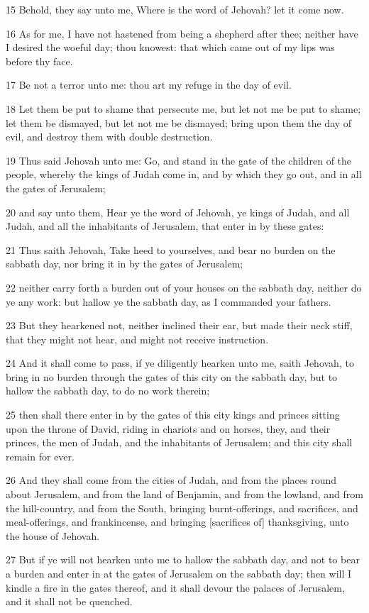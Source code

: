 \par 15 Behold, they say unto me, Where is the word of Jehovah? let it come now.
\par 16 As for me, I have not hastened from being a shepherd after thee; neither have I desired the woeful day; thou knowest: that which came out of my lips was before thy face.
\par 17 Be not a terror unto me: thou art my refuge in the day of evil.
\par 18 Let them be put to shame that persecute me, but let not me be put to shame; let them be dismayed, but let not me be dismayed; bring upon them the day of evil, and destroy them with double destruction.
\par 19 Thus said Jehovah unto me: Go, and stand in the gate of the children of the people, whereby the kings of Judah come in, and by which they go out, and in all the gates of Jerusalem;
\par 20 and say unto them, Hear ye the word of Jehovah, ye kings of Judah, and all Judah, and all the inhabitants of Jerusalem, that enter in by these gates:
\par 21 Thus saith Jehovah, Take heed to yourselves, and bear no burden on the sabbath day, nor bring it in by the gates of Jerusalem;
\par 22 neither carry forth a burden out of your houses on the sabbath day, neither do ye any work: but hallow ye the sabbath day, as I commanded your fathers.
\par 23 But they hearkened not, neither inclined their ear, but made their neck stiff, that they might not hear, and might not receive instruction.
\par 24 And it shall come to pass, if ye diligently hearken unto me, saith Jehovah, to bring in no burden through the gates of this city on the sabbath day, but to hallow the sabbath day, to do no work therein;
\par 25 then shall there enter in by the gates of this city kings and princes sitting upon the throne of David, riding in chariots and on horses, they, and their princes, the men of Judah, and the inhabitants of Jerusalem; and this city shall remain for ever.
\par 26 And they shall come from the cities of Judah, and from the places round about Jerusalem, and from the land of Benjamin, and from the lowland, and from the hill-country, and from the South, bringing burnt-offerings, and sacrifices, and meal-offerings, and frankincense, and bringing [sacrifices of] thanksgiving, unto the house of Jehovah.
\par 27 But if ye will not hearken unto me to hallow the sabbath day, and not to bear a burden and enter in at the gates of Jerusalem on the sabbath day; then will I kindle a fire in the gates thereof, and it shall devour the palaces of Jerusalem, and it shall not be quenched.

